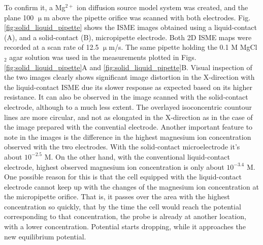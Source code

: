 To confirm it, a Mg$^{2+}$ ion diffusion source model system was created, and the plane 100 $\upmu$m above the pipette orifice was scanned with both electrodes.
Fig. \ref{fig:solid_liquid_pipette} shows the ISME images obtained using a liquid-contact (A), and a solid-contact (B), micropipette electrode.
Both 2D ISME maps were recorded at a scan rate of 12.5 $\upmu$m/s.
The same pipette holding the 0.1 M MgCl$_2$ agar solution was used in the measurements plotted in Figs. \ref{fig:solid_liquid_pipette}A and \ref{fig:solid_liquid_pipette}B.
Visual inspection of the two images clearly shows significant image distortion in the X-direction with the liquid-contact ISME due its slower response as expected based on its higher resistance.
It can also be observed in the image scanned with the solid-contact electrode, although to a much less extent.
The overlayed isoconcentric countour lines are more circular, and not as elongated in the X-direction as in the case of the image prepared with the convential electrode.
Another important feature to note in the images is the difference in the highest magnesium ion concentration observed with the two electrodes.
With the solid-contact microelectrode it's about $10^{-2.5}$ M.
On the other hand, with the conventional liquid-contact electrode, highest observed magnesium ion concentration is only about $10^{-3.4}$ M.
One possible reason for this is that the cell equipped with the liquid-contact electrode cannot keep up with the changes of the magnesium ion concentration at the micropipette orifice.
That is, it passes over the area with the highest concentration so quickly, that by the time the cell would reach the potential corresponding to that concentration, the probe is already at another location, with a lower concentration.
Potential starts dropping, while it approaches the new equilibrium potential.

